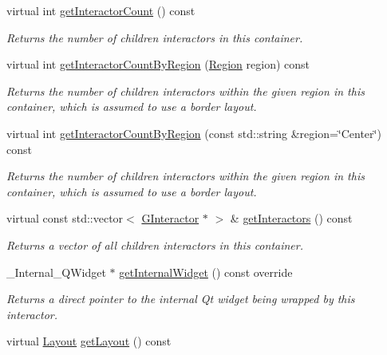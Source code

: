 \begin{DoxyCompactItemize}
virtual int \mbox{\hyperlink{classsgl_1_1GContainer_a789affbf8e89e65e3afd63cc626f5a81}{get\+Interactor\+Count}} () const
\begin{DoxyCompactList}\small\item\em Returns the number of children interactors in this container. \end{DoxyCompactList}\item 
virtual int \mbox{\hyperlink{classsgl_1_1GContainer_a668fe9a4efc31fa065ded79c0e5eab64}{get\+Interactor\+Count\+By\+Region}} (\mbox{\hyperlink{classsgl_1_1GContainer_a81a01a86de31071a92e6cce0bab9bc4b}{Region}} region) const
\begin{DoxyCompactList}\small\item\em Returns the number of children interactors within the given region in this container, which is assumed to use a border layout. \end{DoxyCompactList}\item 
virtual int \mbox{\hyperlink{classsgl_1_1GContainer_ab51dbb723159efca4fc89e2c4211610c}{get\+Interactor\+Count\+By\+Region}} (const std\+::string \&region=\char`\"{}Center\char`\"{}) const
\begin{DoxyCompactList}\small\item\em Returns the number of children interactors within the given region in this container, which is assumed to use a border layout. \end{DoxyCompactList}\item 
virtual const std\+::vector$<$ \mbox{\hyperlink{classsgl_1_1GInteractor}{G\+Interactor}} $\ast$ $>$ \& \mbox{\hyperlink{classsgl_1_1GContainer_a04512d7151516f8a9e7298d72a290008}{get\+Interactors}} () const
\begin{DoxyCompactList}\small\item\em Returns a vector of all children interactors in this container. \end{DoxyCompactList}\item 
\+\_\+\+Internal\+\_\+\+Q\+Widget $\ast$ \mbox{\hyperlink{classsgl_1_1GContainer_a2f6b36b2517087dc90a366b5ce1f5323}{get\+Internal\+Widget}} () const override
\begin{DoxyCompactList}\small\item\em Returns a direct pointer to the internal Qt widget being wrapped by this interactor. \end{DoxyCompactList}\item 
virtual \mbox{\hyperlink{classsgl_1_1GContainer_a1b7da28ed84c0763e8f92cde2df4799b}{Layout}} \mbox{\hyperlink{classsgl_1_1GContainer_aeebcf77b7fdc91a1ba0371cc9b91d5e2}{get\+Layout}} () const

\end{DoxyCompactItemize}
